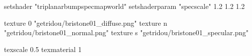 setshader "triplanarbumpspecmapworld"
setshaderparam "specscale" 1.2 1.2 1.2

   texture 0 "getridou/bristone01_diffuse.png"
   texture n "getridou/bristone01_normal.png"
   texture s "getridou/bristone01_specular.png"

texscale 0.5
texmaterial 1
